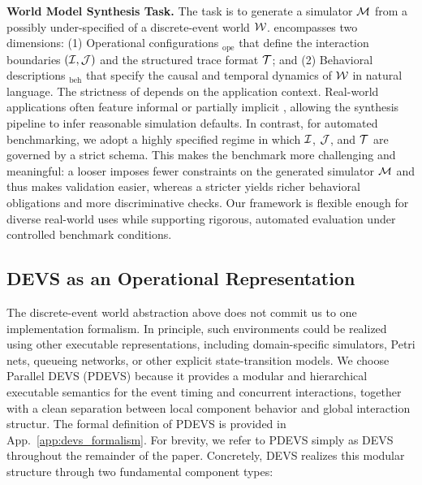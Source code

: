 \textbf{World Model Synthesis Task.}
The task is to generate a simulator $\mathcal{M}$ from a possibly under-specified \spec{} of a discrete-event world $\mathcal{W}$.
\spec{} encompasses two dimensions: (1) Operational configurations \spec$_{\mathrm{ope}}$ that define the interaction boundaries $(\mathcal{I},\mathcal{J})$ and the structured trace format $\mathcal{T}$; and (2) Behavioral descriptions \spec$_{\mathrm{beh}}$ that specify the causal and temporal dynamics of $\mathcal{W}$ in natural language.
The strictness of \spec{} depends on the application context. Real-world applications often feature informal or partially implicit \spec{}, allowing the synthesis pipeline to infer reasonable simulation defaults. In contrast, for automated benchmarking, we adopt a highly specified regime in which $\mathcal{I}$, $\mathcal{J}$, and $\mathcal{T}$ are governed by a strict schema. This makes the benchmark more challenging and meaningful: a looser \spec{} imposes fewer constraints on the generated simulator $\mathcal{M}$ and thus makes validation easier, whereas a stricter \spec{} yields richer behavioral obligations and more discriminative checks. Our framework is flexible enough for diverse real-world uses while supporting rigorous, automated evaluation under controlled benchmark conditions.



\subsection{DEVS as an Operational Representation}
\label{sec:devs_representation}

The discrete-event world abstraction above does not commit us to one implementation formalism. In principle, such environments could be realized using other executable representations, including domain-specific simulators, Petri nets, queueing networks, or other explicit state-transition models. We choose Parallel DEVS (PDEVS) \cite{RiscoMartin2023xDEVS} because it provides a modular and hierarchical executable semantics for the event timing and concurrent interactions, together with a clean separation between local component behavior and global interaction structur. The formal definition of PDEVS is provided in App.~\ref{app:devs_formalism}. For brevity, we refer to PDEVS simply as DEVS throughout the remainder of the paper.
Concretely, DEVS realizes this modular structure through two fundamental component types:

